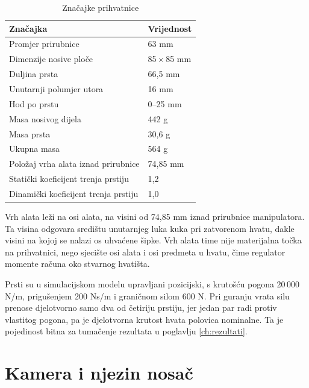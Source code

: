\begin{table}[H]
    \centering
    \caption{Značajke prihvatnice}
    \label{tab:gripper}
    \begin{tabular}{@{}ll@{}}
        \toprule
        Značajka                             & Vrijednost          \\
        \midrule
        Promjer prirubnice                   & 63 mm               \\
        Dimenzije nosive ploče               & 85\,$\times$\,85 mm \\
        Duljina prsta                        & 66,5 mm             \\
        Unutarnji polumjer utora             & 16 mm               \\
        Hod po prstu                         & 0--25 mm            \\
        Masa nosivog dijela                  & 442 g               \\
        Masa prsta                           & 30,6 g              \\
        Ukupna masa                          & 564 g               \\
        Položaj vrha alata iznad prirubnice  & 74,85 mm            \\
        Statički koeficijent trenja prstiju  & 1,2                 \\
        Dinamički koeficijent trenja prstiju & 1,0                 \\
        \bottomrule
    \end{tabular}
\end{table}

Vrh alata leži na osi alata, na visini od 74,85 mm iznad prirubnice manipulatora. Ta visina
odgovara središtu unutarnjeg luka kuka pri zatvorenom hvatu, dakle visini na kojoj se nalazi
os uhvaćene šipke. Vrh alata time nije materijalna točka na prihvatnici, nego sjecište osi
alata i osi predmeta u hvatu, čime regulator momente računa oko stvarnog hvatišta.

Prsti su u simulacijskom modelu upravljani pozicijski, s krutošću pogona 20\,000 N/m,
prigušenjem 200 Ns/m i graničnom silom 600 N. Pri guranju vrata silu prenose djelotvorno samo
dva od četiriju prstiju, jer jedan par radi protiv vlastitog pogona, pa je djelotvorna krutost
hvata polovica nominalne. Ta je pojedinost bitna za tumačenje rezultata u poglavlju
\ref{ch:rezultati}.

\section{Kamera i njezin nosač}
\label{sec:kamera-nosac}

